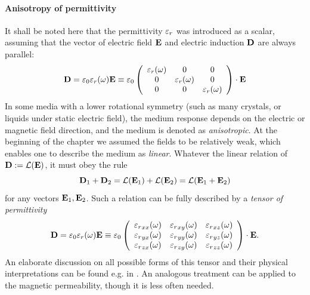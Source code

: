 \paragraph{Anisotropy of permittivity} \label{par_anisotropy} %
It shall be noted here that the permittivity $\varepsilon_r$ was introduced as a scalar, assuming that the vector of electric field $\mathbf{E}$ and electric induction $\mathbf{D}$ are always parallel:
\begin{equation} \mathbf{D} = \varepsilon_0 \varepsilon_r(\omega) \mathbf{E} \equiv \varepsilon_0  
	\left(\begin{array}{ccc} 
			\varepsilon_r(\omega) & 0 & 0  \\
			0 & \varepsilon_r(\omega) & 0  \\
			0 & 0 &\varepsilon_r(\omega)  
	\end{array} \right) \cdot \mathbf{E}
	\label{eq_ed_orientation}
\end{equation}
In some media with a lower rotational symmetry (such as many crystals, or liquids under static electric field), the medium response depends on the electric or magnetic field direction, and the medium is denoted as \textit{anisotropic}. At the beginning of the chapter we assumed the fields to be relatively weak, which enables one to describe the medium as \textit{linear}. Whatever the linear relation of $\mathbf{D} := \mathcal{L}(\mathbf{E})$, it must obey the rule
$$\mathbf{D}_1 + \mathbf{D}_2 = \mathcal{L}(\mathbf{E}_1) + \mathcal{L}(\mathbf{E}_2) = \mathcal{L}(\mathbf{E}_1 + \mathbf{E}_2)$$
for any vectors $\mathbf{E}_1, \mathbf{E}_2$. Such a relation can be fully described by a \textit{tensor of permittivity} 
\begin{equation} \mathbf{D} = \varepsilon_0 \varepsilon_r(\omega) \mathbf{E} \equiv \varepsilon_0  
	\left(\begin{array}{ccc} 
	{\varepsilon_r}_{xx}(\omega) & {\varepsilon_r}_{xy}(\omega) & {\varepsilon_r}_{xz}(\omega)  \\
	{\varepsilon_r}_{yx}(\omega) & {\varepsilon_r}_{yy}(\omega) & {\varepsilon_r}_{yz}(\omega)  \\
	{\varepsilon_r}_{zx}(\omega) & {\varepsilon_r}_{zy}(\omega) & {\varepsilon_r}_{zz}(\omega)  
	\end{array} \right) \cdot \mathbf{E}.
	\label{eq_epstensor}
\end{equation}
An elaborate discussion on all possible forms of this tensor and their physical interpretations can be found e.g. in \cite[pp. 678--686]{born1999book}. An analogous treatment can be applied to the magnetic permeability, though it is less often needed.

